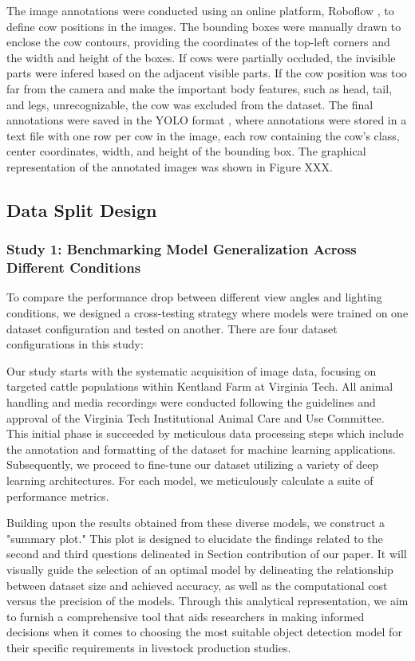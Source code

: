 The image annotations were conducted using an online platform, Roboflow \citep{}, to define cow positions in the images. The bounding boxes were manually drawn to enclose the cow contours, providing the coordinates of the top-left corners and the width and height of the boxes. If cows were partially occluded, the invisible parts were infered based on the adjacent visible parts. If the cow position was too far from the camera and make the important body features, such as head, tail, and legs, unrecognizable, the cow was excluded from the dataset. The final annotations were saved in the YOLO format \citep{}, where annotations were stored in a text file with one row per cow in the image, each row containing the cow's class, center coordinates, width, and height of the bounding box. The graphical representation of the annotated images was shown in Figure XXX.

\subsection*{Data Split Design}

\subsubsection*{Study 1: Benchmarking Model Generalization Across Different Conditions}

To compare the performance drop between different view angles and lighting conditions, we designed a cross-testing strategy where models were trained on one dataset configuration and tested on another. There are four dataset configurations in this study: 






Our study starts with the systematic acquisition of image data, focusing on targeted cattle populations within Kentland Farm at Virginia Tech. All animal handling and media recordings were conducted following the guidelines and approval of the Virginia Tech Institutional Animal Care and Use Committee. This initial phase is succeeded by meticulous data processing steps which include the annotation and formatting of the dataset for machine learning applications. Subsequently, we proceed to fine-tune our dataset utilizing a variety of deep learning architectures. For each model, we meticulously calculate a suite of performance metrics.

Building upon the results obtained from these diverse models, we construct a "summary plot." This plot is designed to elucidate the findings related to the second and third questions delineated in Section {contribution} of our paper. It will visually guide the selection of an optimal model by delineating the relationship between dataset size and achieved accuracy, as well as the computational cost versus the precision of the models. Through this analytical representation, we aim to furnish a comprehensive tool that aids researchers in making informed decisions when it comes to choosing the most suitable object detection model for their specific requirements in livestock production studies.

